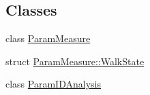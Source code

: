 \subsection*{Classes}
\begin{DoxyCompactItemize}
\item 
class \mbox{\hyperlink{class_param_measure}{Param\+Measure}}
\item 
struct \mbox{\hyperlink{struct_param_measure_1_1_walk_state}{Param\+Measure\+::\+Walk\+State}}
\item 
class \mbox{\hyperlink{class_param_i_d_analysis}{Param\+I\+D\+Analysis}}
\end{DoxyCompactItemize}
